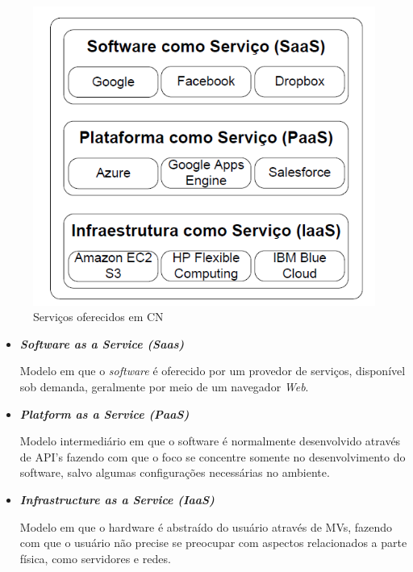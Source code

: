 \documentclass[tcc,capa]{texufpel}
\begin{document}
\begin{figure}
   \centering
    \includegraphics[scale=0.65]{images/modelosdenegocioCN.PNG}
    \caption{Serviços oferecidos em CN
    \cite{batista2016modelos}}
    \label{figuramodelosdenegocio}
\end{figure}

\begin{itemize} 

\item \textbf{\emph{Software as a Service (Saas)}}

Modelo em que o \emph{software} é oferecido por um provedor de serviços, disponível sob demanda, geralmente por meio de um navegador \emph{Web}.

\item \textbf{\emph{Platform as a Service (PaaS)}}

Modelo intermediário em que o software é normalmente desenvolvido através de API's fazendo com que o foco se concentre somente no desenvolvimento do software, salvo algumas configurações necessárias no ambiente.

\item \textbf{\emph{Infrastructure as a Service (IaaS)}}

Modelo em que o hardware é abstraído do usuário através de MVs, fazendo com que o usuário não precise se preocupar com aspectos relacionados a parte física, como servidores e redes.

\end{itemize}
\end{document}
